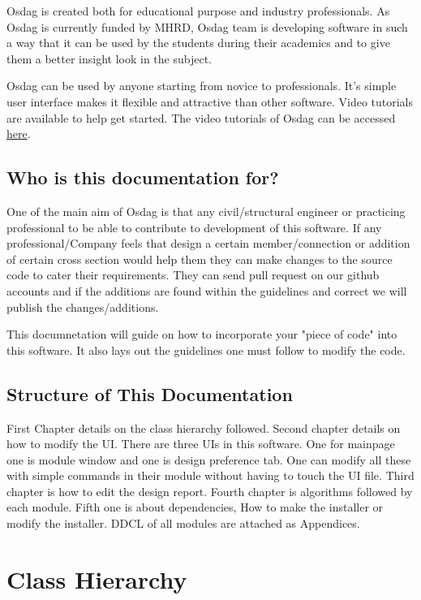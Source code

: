 \documentclass[11pt,a4paper]{report}
\begin{document}
\noindent Osdag is created both for educational purpose and industry professionals. As Osdag is currently funded by MHRD, Osdag team is developing software in such a way that it can be used by the students during their academics and to give them a better insight look in the subject.

\noindent Osdag can be used by anyone starting from novice to professionals. It's simple user interface makes it flexible and attractive than other software. Video tutorials are available to help get started. The video tutorials of Osdag can be accessed \href{https://osdag.fossee.in/resources/videos}{here}.

\section{Who is this documentation for?}

\noindent One of the main aim of Osdag is that any civil/structural engineer or practicing professional to be able to contribute to development of this software. If any professional/Company feels that design a certain member/connection or addition of certain cross section would help them they can make changes to the source code to cater their requirements. They can send pull request on our github accounts and if the additions are found within the guidelines and correct we will publish the changes/additions.

This documnetation will guide on how to incorporate your "piece of code" into this software. It also lays out the guidelines one must follow to modify the code.

\section{Structure of This Documentation}

\noindent First Chapter details on the class hierarchy followed. Second chapter details on how to modify the UI. There are three UIs in this software. One for mainpage one is module window and one is design preference tab. One can modify all these with simple commands in their module without having to touch the UI file. Third chapter is how to edit the design report. Fourth chapter is algorithms followed by each module. Fifth one is about dependencies, How to make the installer or modify the installer. DDCL of all modules are attached as Appendices.


\chapter{\textbf{Class Hierarchy}}
\end{document}
